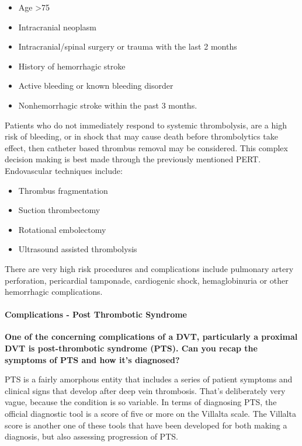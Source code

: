 \documentclass[
]{book}
\begin{document}
\begin{itemize}
\item
  Age \textgreater75
\item
  Intracranial neoplasm
\item
  Intracranial/spinal surgery or trauma with the last 2 months
\item
  History of hemorrhagic stroke
\item
  Active bleeding or known bleeding disorder
\item
  Nonhemorrhagic stroke within the past 3 months.
\end{itemize}

Patients who do not immediately respond to systemic thrombolysis, are a
high risk of bleeding, or in shock that may cause death before
thrombolytics take effect, then catheter based thrombus removal may be
considered. This complex decision making is best made through the
previously mentioned PERT.\citep{xenos2019} Endovascular techniques include:

\begin{itemize}
\item
  Thrombus fragmentation
\item
  Suction thrombectomy
\item
  Rotational embolectomy
\item
  Ultrasound assisted thrombolysis
\end{itemize}

There are very high risk procedures and complications include pulmonary
artery perforation, pericardial tamponade, cardiogenic shock,
hemaglobinuria or other hemorrhagic complications.

\hypertarget{complications---post-thrombotic-syndrome}{%
\paragraph{Complications - Post Thrombotic Syndrome}\label{complications---post-thrombotic-syndrome}}

\textbf{One of the concerning complications of a DVT, particularly a proximal
DVT is post-thrombotic syndrome (PTS). Can you recap the symptoms of PTS
and how it's diagnosed?}

PTS is a fairly amorphous entity that includes a series of patient
symptoms and clinical signs that develop after deep vein thrombosis.
That's deliberately very vague, because the condition is so variable. In
terms of diagnosing PTS, the official diagnostic tool is a score of five
or more on the Villalta scale. The Villalta score is another one of
these tools that have been developed for both making a diagnosis, but
also assessing progression of PTS.\citep{kahn2014, villalta1994}
\end{document}
